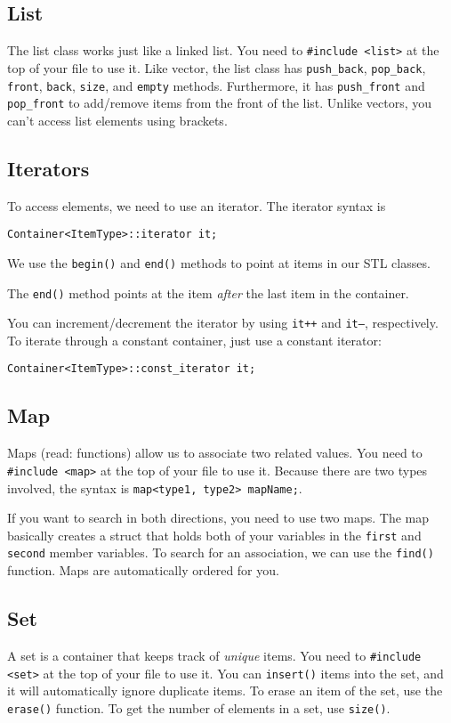 \documentclass[class=article, crop=false]{standalone}
\begin{document}
  \subsection{List}
  The list class works just like a linked list. You need to \texttt{\#include <list>} at the top of your file to use it. Like vector, the list class has \texttt{push\_back}, \texttt{pop\_back}, \texttt{front}, \texttt{back}, \texttt{size}, and \texttt{empty} methods. Furthermore, it has \texttt{push\_front} and \texttt{pop\_front} to add/remove items from the front of the list. Unlike vectors, you can't access list elements using brackets.\par 
  \subsection{Iterators}
  To access elements, we need to use an iterator. The iterator syntax is 
  \begin{center}\texttt{Container<ItemType>::iterator it;}\end{center}
  We use the \texttt{begin()} and \texttt{end()} methods to point at items in our STL classes.
  \begin{note}{}
    The \texttt{end()} method points at the item \emph{after} the last item in the container.
  \end{note}
  You can increment/decrement the iterator by using \texttt{it++} and \texttt{it--}, respectively. To iterate through a constant container, just use a constant iterator:
  \begin{center}\texttt{Container<ItemType>::const\_iterator it;}\end{center}
  \subsection{Map}
  Maps (read: functions) allow us to associate two related values. You need to \texttt{\#include <map>} at the top of your file to use it. Because there are two types involved, the syntax is \texttt{map<type1, type2> mapName;}. \par
  If you want to search in both directions, you need to use two maps. The map basically creates a struct that holds both of your variables in the \texttt{first} and \texttt{second} member variables. To search for an association, we can use the \texttt{find()} function. Maps are automatically ordered for you. 
  \subsection{Set}
  A set is a container that keeps track of \emph{unique} items. You need to \texttt{\#include <set>} at the top of your file to use it. You can \texttt{insert()} items into the set, and it will automatically ignore duplicate items. To erase an item of the set, use the \texttt{erase()} function. To get the number of elements in a set, use \texttt{size()}.
\end{document}
